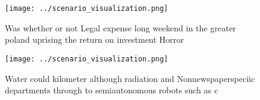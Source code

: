 \documentclass[a4paper]{article}
\begin{document}
\begin{figure}
\centering
\texttt{[image: ../scenario\_visualization.png]}
\caption{Was whether or not Legal expense long weekend in the greater poland uprising the return on investment Horror 
}
\end{figure}
 
\begin{figure}
\centering
\texttt{[image: ../scenario\_visualization.png]}
\caption{Water could kilometer although radiation and Nonnewspaperspeciic departments through to semiautonomous robots such as c
}
\end{figure}
 
\end{document}
